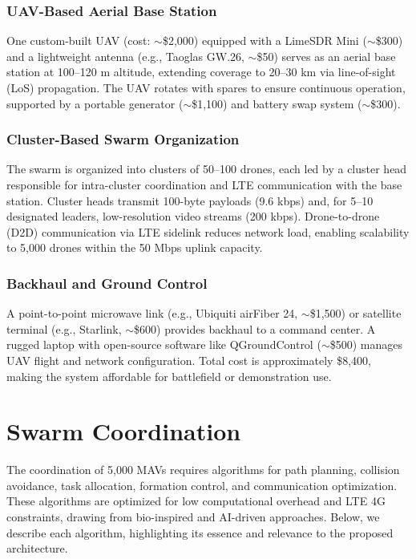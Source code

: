 \documentclass{article}
\begin{document}
\subsubsection{UAV-Based Aerial Base Station}
One custom-built UAV (cost: $\sim$\$2,000) equipped with a LimeSDR Mini ($\sim$\$300) and a lightweight antenna (e.g., Taoglas GW.26, $\sim$\$50) serves as an aerial base station at 100--120 m altitude, extending coverage to 20--30 km via line-of-sight (LoS) propagation. The UAV rotates with spares to ensure continuous operation, supported by a portable generator ($\sim$\$1,100) and battery swap system ($\sim$\$300).

\subsubsection{Cluster-Based Swarm Organization}
The swarm is organized into clusters of 50--100 drones, each led by a cluster head responsible for intra-cluster coordination and LTE communication with the base station. Cluster heads transmit 100-byte payloads (9.6 kbps) and, for 5--10 designated leaders, low-resolution video streams (200 kbps). Drone-to-drone (D2D) communication via LTE sidelink reduces network load, enabling scalability to 5,000 drones within the 50 Mbps uplink capacity.

\subsubsection{Backhaul and Ground Control}
A point-to-point microwave link (e.g., Ubiquiti airFiber 24, $\sim$\$1,500) or satellite terminal (e.g., Starlink, $\sim$\$600) provides backhaul to a command center. A rugged laptop with open-source software like QGroundControl ($\sim$\$500) manages UAV flight and network configuration. Total cost is approximately \$8,400, making the system affordable for battlefield or demonstration use.

\section{Swarm Coordination}
The coordination of 5,000 MAVs requires algorithms for path planning, collision avoidance, task allocation, formation control, and communication optimization. These algorithms are optimized for low computational overhead and LTE 4G constraints, drawing from bio-inspired and AI-driven approaches. Below, we describe each algorithm, highlighting its essence and relevance to the proposed architecture.
\end{document}
